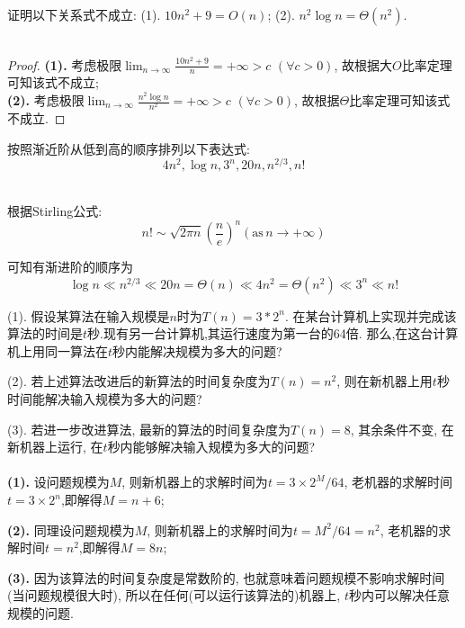 \documentclass{article}
\begin{document}
\begin{homeworkProblem}
	证明以下关系式不成立: (1). $10n^2+9=O\left( n \right) $; \quad (2). $n^2\log n=\Theta \left( n^2 \right)$.
	\\

	\solution
	\\

	\begin{proof}

		\textbf{(1).} 考虑极限$\displaystyle \lim_{n\rightarrow \infty} \frac{10n^2+9}{n}=+\infty >c\,\,\left( \forall c>0 \right) $, 故根据大$O$比率定理可知该式不成立;
		\\ 

		\textbf{(2).} 考虑极限$\displaystyle \lim_{n\rightarrow \infty} \frac{n^2\log n}{n^2}=+\infty >c\,\,\left( \forall c>0 \right) $, 故根据$\Theta$比率定理可知该式不成立.
	\end{proof}
	
\end{homeworkProblem}

\begin{homeworkProblem}
	按照渐近阶从低到高的顺序排列以下表达式:
	$$4 n^2, \log n, 3^n, 20 n, n^{2 / 3}, n !$$

	\solution
	\\

	根据Stirling公式:$$n!\sim \sqrt{2\pi n}\left( \frac{n}{e} \right) ^n (\text{as}\, n\to +\infty)$$

	可知有渐进阶的顺序为$$\log n\ll n^{2 / 3} \ll 20n=\Theta \left( n \right) \ll 4n^2=\Theta \left( n^2 \right) \ll 3^n\ll n!
	$$
\end{homeworkProblem}

\begin{homeworkProblem}

	(1). 假设某算法在输入规模是$n$时为$T(n)=3\ast 2^n$. 在某台计算机上实现并完成该算法的时间是$t$秒.现有另一台计算机,其运行速度为第一台的64倍. 那么,在这台计算机上用同一算法在$t$秒内能解决规模为多大的问题?

	(2). 若上述算法改进后的新算法的时间复杂度为$T(n)=n^2$, 则在新机器上用$t$秒时间能解决输入规模为多大的问题?

	(3). 若进一步改进算法, 最新的算法的时间复杂度为$T(n)=8$, 其余条件不变, 在新机器上运行, 在$t$秒内能够解决输入规模为多大的问题?
	\\

	\solution
	\\

	\textbf{(1).} 设问题规模为$M$, 则新机器上的求解时间为$t=3\times 2^M/64$, 老机器的求解时间$t= 3\times 2^n$,即解得$M=n+6$;

	\textbf{(2).} 同理设问题规模为$M$, 则新机器上的求解时间为$t=M^2/64=n^2$, 老机器的求解时间$t=n^2$,即解得$M=8n$;

	\textbf{(3).} 因为该算法的时间复杂度是常数阶的, 也就意味着问题规模不影响求解时间(当问题规模很大时), 所以在任何(可以运行该算法的)机器上, $t$秒内可以解决任意规模的问题.

\end{homeworkProblem}
\end{document}
